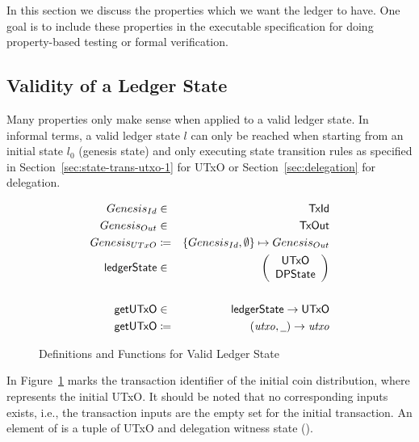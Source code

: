 In this section we discuss the properties which we want the ledger to have. One
goal is to include these properties in the executable specification for doing
property-based testing or formal verification.

\subsection{Validity of a Ledger State}
\label{sec:valid-ledg-state}

Many properties only make sense when applied to a valid ledger state. In
informal terms, a valid ledger state $l$ can only be reached when starting from
an initial state $l_{0}$ (genesis state) and only executing state transition
rules as specified in Section~\ref{sec:state-trans-utxo-1} for UTxO or
Section~\ref{sec:delegation} for delegation.

\begin{figure}[ht]
  \centering
  \begin{align*}
    \genesisId & \in & \TxId \\
    \genesisTxOut & \in & \TxOut \\
    \genesisUTxO & \coloneqq & \{\genesisId, \emptyset\} \mapsto \genesisTxOut
    \\
    \ledgerState & \in & \left(
                         \begin{array}{c}
                           \UTxO \\
                           \DPState
                         \end{array}
    \right)\\
               && \\
    \fun{getUTxO} & \in & \ledgerState \to \UTxO \\
    \fun{getUTxO} & \coloneqq & (\var{utxo}, \wcard) \to \var{utxo}
  \end{align*}
  \caption{Definitions and Functions for Valid Ledger State}
  \label{fig:valid-ledger}
\end{figure}

In Figure~\ref{fig:valid-ledger} \genesisId{} marks the transaction identifier
of the initial coin distribution, where \genesisTxOut{} represents the initial
UTxO. It should be noted that no corresponding inputs exists, i.e., the
transaction inputs are the empty set for the initial transaction. An element of
\ledgerState{} is a tuple of UTxO and delegation witness state (\DPState).

